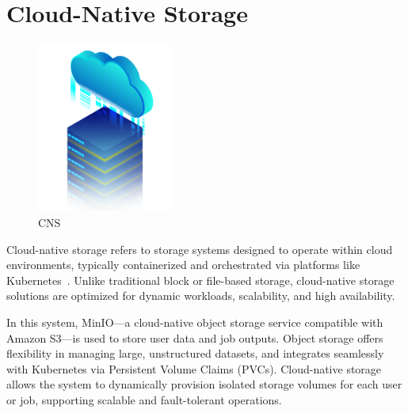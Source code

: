 \newpage
\section{Cloud-Native Storage}

\begin{figure}[h!]
  \centering
  \includegraphics[width=0.4\textwidth]{Images/img-hybrid-cloud-engineer.png}
  \caption{CNS}
  \label{fig:cns}
\end{figure}

Cloud-native storage refers to storage systems designed to operate within cloud environments, typically containerized and orchestrated 
via platforms like Kubernetes~\cite{cncf-storage}. Unlike traditional block or file-based storage, cloud-native storage solutions are 
optimized for dynamic workloads, scalability, and high availability.

In this system, MinIO—a cloud-native object storage service compatible with Amazon S3—is used to store user data and job outputs. 
Object storage offers flexibility in managing large, unstructured datasets, and integrates seamlessly with Kubernetes via 
Persistent Volume Claims (PVCs). Cloud-native storage allows the system to dynamically provision isolated storage volumes for each 
user or job, supporting scalable and fault-tolerant operations.

